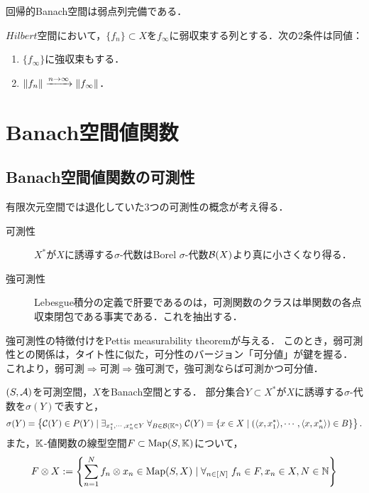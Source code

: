 \documentclass[uplatex,dvipdfmx]{jsreport}
\begin{document}
\begin{theorem}
    回帰的Banach空間は弱点列完備である．
\end{theorem}

\begin{theorem}
    $Hilbert$空間において，$\{f_n\}\subset X$を$f_\infty$に弱収束する列とする．次の2条件は同値：
    \begin{enumerate}
        \item $\{f_\infty\}$に強収束もする．
        \item $\|f_n\|\xrightarrow{n\to\infty}\|f_\infty\|$．
    \end{enumerate}
\end{theorem}

\section{Banach空間値関数}

\subsection{Banach空間値関数の可測性}

\begin{tcolorbox}[colframe=ForestGreen, colback=ForestGreen!10!white,breakable,colbacktitle=ForestGreen!40!white,coltitle=black,fonttitle=\bfseries\sffamily,
title=]
    有限次元空間では退化していた3つの可測性の概念が考え得る．
    \begin{description}
        \item[可測性] $X^*$が$X$に誘導する$\sigma$-代数はBorel $\sigma$-代数$\mathcal{B}(X)$より真に小さくなり得る．
        \item[強可測性] Lebesgue積分の定義で肝要であるのは，可測関数のクラスは単関数の各点収束閉包である事実である．これを抽出する．
    \end{description}
    強可測性の特徴付けをPettis measurability theoremが与える．
    このとき，弱可測性との関係は，タイト性に似た，可分性のバージョン「可分値」が鍵を握る．
    これより，弱可測$\Rightarrow$可測$\Rightarrow$強可測で，強可測ならば可測かつ可分値．
\end{tcolorbox}

\begin{notation}
    $(S,\mathcal{A})$を可測空間，$X$をBanach空間とする．
    部分集合$Y\subset X^*$が$X$に誘導する$\sigma$-代数を$\sigma(Y)$で表すと，
    \[\sigma(Y)=\left\{\mathcal{C}(Y)\in P(Y)\mid\exists_{x_1^*,\cdots,x_n^*\in Y}\;\forall_{B\in\mathcal{B}(\mathbb{K}^n)}\;\mathcal{C}(Y)=\left\{x\in X\mid (\langle x,x_1^*\rangle,\cdots,\langle x,x_n^*\rangle)\in B\right\}\right\}.\]
    また，$\mathbb{K}$-値関数の線型空間$F\subset\mathrm{Map}(S,\mathbb{K})$について，
    \[F\otimes X:=\left\{\sum^N_{n=1}f_n\otimes x_n\in\mathrm{Map}(S,X)\mid\forall_{n\in[N]}\;f_n\in F,x_n\in X,N\in\mathbb{N}\right\}\]
\end{notation}
\end{document}
